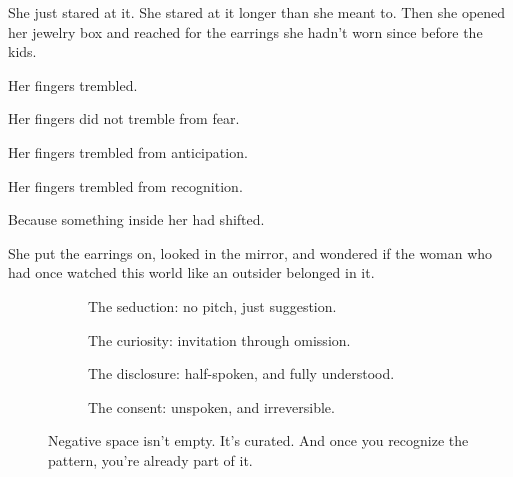 She just stared at it. She stared at it longer than she meant to.
Then she opened her jewelry box and reached for the earrings she hadn’t worn since before the kids.

Her fingers trembled.

Her fingers did not tremble from fear.  

Her fingers trembled from anticipation.

Her fingers trembled from recognition.

Because something inside her had shifted.

She put the earrings on, looked in the mirror, and wondered if the woman who had once watched this world 
like an outsider belonged in it.

\medskip

\begin{figure}[H]
  \centering
  
  \begin{subfigure}[t]{0.45\textwidth}
  \centering
  \caption*{The seduction: no pitch, just suggestion.}
  \end{subfigure}
  \hfill
  \begin{subfigure}[t]{0.45\textwidth}
  \centering
  \caption*{The curiosity: invitation through omission.}
  \end{subfigure}
  
  \vspace{1em}
  
  \begin{subfigure}[t]{0.45\textwidth}
  \centering
  \caption*{The disclosure: half-spoken, and fully understood.}
  \end{subfigure}
  \hfill
  \begin{subfigure}[t]{0.45\textwidth}
  \centering
  \caption*{The consent: unspoken, and irreversible.}
  \end{subfigure}
  
  \caption*{Negative space isn’t empty. It’s curated. And once you recognize the pattern, you’re already part of it.}
\end{figure}

